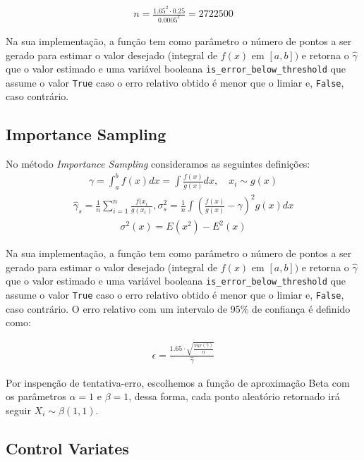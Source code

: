 \documentclass[twocolumn,amsmath,amssymb,floatfix]{revtex4}
\begin{document}
\begin{eqnarray}
n = \frac{1.65^{2} \cdot 0.25}{0.0005^{2}} = 2722500
\end{eqnarray}

Na sua implementação, a função tem como parâmetro o número de pontos a ser gerado para estimar o valor desejado (integral de $f(x)$ em $[a,b])$ e retorna o $\hat{\gamma}$ que o valor estimado e uma variável booleana \verb|is_error_below_threshold| que assume o valor \verb|True| caso o erro relativo obtido é menor que o limiar e, \verb|False|, caso contrário.

\subsection{Importance Sampling}

No método \textit{Importance Sampling} consideramos as seguintes definições:
\begin{eqnarray}
\gamma = \int_{a}^{b}f(x)dx = \int \frac{f(x)}{g(x)}dx,\quad x_{i} \sim g(x)
\end{eqnarray}
\begin{eqnarray}
\hat{\gamma}_{s} = \frac{1}{n}\sum_{i=1}^{n}\frac{f(x_{i}}{g(x_{i})}, \sigma_{s}^{2} = \frac{1}{n}\int\left(\frac{f(x)}{g(x)}-\gamma\right)^{2}g(x)dx
\end{eqnarray}
\begin{eqnarray}
\sigma^{2}(x) = E(x^{2})-E^{2}(x)
\end{eqnarray}

Na sua implementação, a função tem como parâmetro o número de pontos a ser gerado para estimar o valor desejado (integral de $f(x)$ em $[a,b])$ e retorna o $\hat{\gamma}$ que o valor estimado e uma variável booleana \verb|is_error_below_threshold| que assume o valor \verb|True| caso o erro relativo obtido é menor que o limiar e, \verb|False|, caso contrário. O erro relativo com um intervalo de 95\% de confiança é definido como:

\begin{eqnarray}
\epsilon = \frac{1.65\cdot\sqrt{\frac{Var(\hat{\gamma})}{n}}}{\hat{\gamma}}
\end{eqnarray}

Por inspenção de tentativa-erro, escolhemos a função de aproximação Beta com os parâmetros $\alpha = 1$ e $\beta = 1$, dessa forma, cada ponto aleatório retornado irá seguir $X_{i}\sim\beta(1,1)$.


\subsection{Control Variates}
\end{document}
